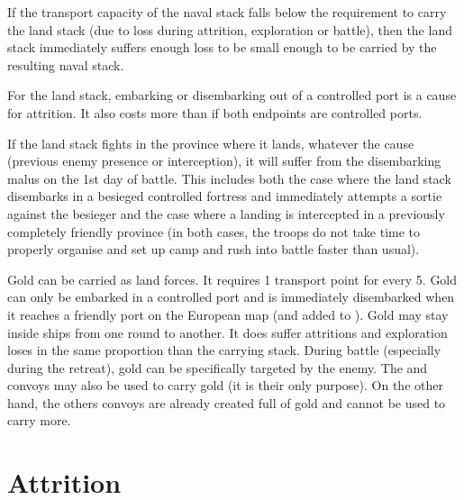 If the transport capacity of the naval stack falls below the requirement to
carry the land stack (due to loss during attrition, exploration or battle),
then the land stack immediately suffers enough loss to be small enough to be
carried by the resulting naval stack.

For the land stack, embarking or disembarking out of a controlled port is a
cause for attrition. It also costs more \MP than if both endpoints are
controlled ports.

If the land stack fights in the province where it lands, whatever the cause
(previous enemy presence or interception), it will suffer from the
disembarking malus on the 1st day of battle. This includes both the case where
the land stack disembarks in a besieged controlled fortress and immediately
attempts a sortie against the besieger and the case where a landing is
intercepted in a previously completely friendly province (in both cases, the
troops do not take time to properly organise and set up camp and rush into
battle faster than usual).

Gold can be carried as land forces. It requires 1 transport point for every
5\ducats. Gold can only be embarked in a controlled port and is immediately
disembarked when it reaches a friendly port on the European map (and added to
). Gold may stay inside ships from
one round to another. It does suffer attritions and exploration loses in the
same proportion than the carrying stack. During battle (especially during the
retreat), gold can be specifically targeted by the enemy. The  and  convoys may also be used to carry gold (it
is their only purpose). On the other hand, the others convoys are already
created full of gold and cannot be used to carry more.



\section{Attrition}
\label{chMilitary:Attrition}
